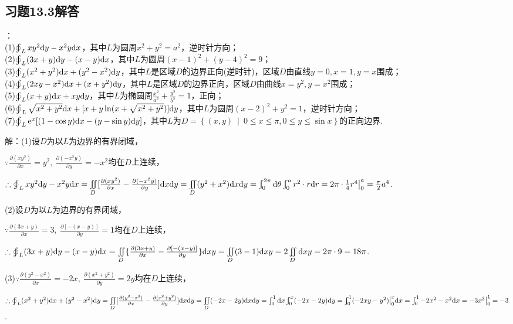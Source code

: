 \documentclass[12pt,UTF8]{ctexart}
\newcommand\Set[2]{\left\{#1\ \middle\vert\ #2 \right\}}
\newcommand{\Int}[4]{\varint\nolimits_{#1}^{#2}#3\mathrm d#4}
\newcommand{\IInt}[3]{\iint\limits_{#1}#2\mathrm d#3}
\newcommand{\varIInt}[4]{\iint\limits_{#1}#2\mathrm d#3\mathrm d#4}
\newcommand{\BLOInt}[2]{\varoint\nolimits_{#1}#2}
\newcommand{\md}[1]{\mathrm d#1}
\begin{document}
\subsection{习题13.3解答}
\begin{enumerate}
：\\
(1)$\BLOInt L{xy^2\md y-x^2y\md x}$，其中$L$为圆周$x^2+y^2=a^2$，逆时针方向；\\
(2)$\BLOInt L{(3x+y)\md y-(x-y)\md x}$，其中$L$为圆周$(x-1)^2+(y-4)^2=9$；\\
(3)$\BLOInt L{(x^2+y^2)\md x+(y^2-x^2)\md y}$，其中$L$是区域$D$的边界正向(逆时针)，区域$D$由直线$y=0,x=1,y=x$围成；\\
(4)$\BLOInt L{(2xy-x^2)\md x+(x+y^2)\md y}$，其中$L$是区域$D$的边界正向，区域$D$由曲线$x=y^2,y=x^2$围成；\\
(5)$\BLOInt L{(x+y)\md x+xy\md y}$，其中$L$为椭圆周$\frac{x^2}{a^2}+\frac{y^2}{b^2}=1$，正向；\\
(6)$\BLOInt L{\sqrt{x^2+y^2}\md x+[x+y\ln(x+\sqrt{x^2+y^2})]\md y}$，其中$L$为圆周$(x-2)^2+y^2=1$，逆时针方向；\\
(7)$\BLOInt L{\mathrm e^x[(1-\cos y)\md x-(y-\sin y)\md y]}$，其中$L$为$D=\Set{(x,y)}{0\leqslant x\leqslant\pi,0\leqslant y\leqslant\sin x}$的正向边界.

解：(1)设$D$为以$L$为边界的有界闭域，

$\because\frac{\partial(xy^2)}{\partial x}=y^2,\ \frac{\partial(-x^2y)}{\partial y}=-x^2$均在$D$上连续，

$\therefore\BLOInt L{xy^2\md y-x^2y\md x}=\varIInt D{[\frac{\partial(xy^2)}{\partial x}-\frac{\partial(-x^2y)}{\partial y}]}xy=\varIInt D{(y^2+x^2)}xy=\Int0{2\pi}{}\theta\Int0a{r^2\cdot r}r\\
=2\pi\cdot\frac14r^4\big|_0^a=\frac\pi2a^4$.

(2)设$D$为以$L$为边界的有界闭域，

$\because\frac{\partial(3x+y)}{\partial x}=3,\ \frac{\partial[-(x-y)]}{\partial y}=1$均在$D$上连续，

$\therefore\BLOInt L{(3x+y)\md y-(x-y)\md x}=\IInt D{\{\frac{\partial(3x+y)}{\partial x}-\frac{\partial[-(x-y)]}{\partial y}\}}xy=\IInt D{(3-1)}xy=2\IInt D{}xy\\
=2\pi\cdot9=18\pi$.

(3)$\because\frac{\partial(y^2-x^2)}{\partial x}=-2x,\ \frac{\partial(x^2+y^2)}{\partial y}=2y$均在$D$上连续，

$\therefore\BLOInt L{(x^2+y^2)\md x+(y^2-x^2)\md y}=\varIInt D{[\frac{\partial(y^2-x^2)}{\partial x}-\frac{\partial(x^2+y^2)}{\partial y}]}xy=\varIInt D{(-2x-2y)}xy\\
=\Int01{}x\Int0x{(-2x-2y)}y=\Int01{(-2xy-y^2)\big|_0^x}x=\Int01{-2x^2-x^2}x=-3x^3\big|_0^1=-3$.


\end{enumerate}
\end{document}
